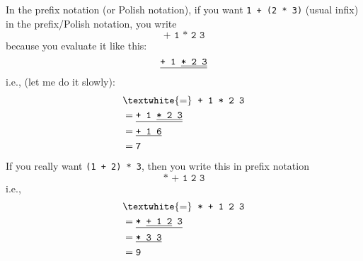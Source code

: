 In the prefix notation (or Polish notation),
if you want \verb!1 + (2 * 3)! (usual infix) in the prefix/Polish notation,
you
write
\[
\texttt{+ 1 * 2 3}
\]
because you evaluate it like this:
\[
\texttt{\underline{+ 1 \underline{* 2 3}}}
\]
i.e., (let me do it slowly):
\begin{align*}
&\text{\textwhite{=}} \hspace{0.2cm} \texttt{+ 1 * 2 3} \\
&= \texttt{\underline{+ 1 \underline{* 2 3}}} \\
&= \texttt{\underline{+ 1 6}} \\
&= \texttt{7} \\
\end{align*}
If you really want \verb!(1 + 2) * 3!, then you write this in prefix
notation
\[
\texttt{* + 1 2 3}
\]
i.e.,
\begin{align*}
&\text{\textwhite{=}} \hspace{0.2cm} \texttt{* + 1 2 3} \\
&= \texttt{\underline{* \underline{+ 1 2} 3}} \\
&= \texttt{\underline{* 3 3}} \\
&= \texttt{9} 
\end{align*}

